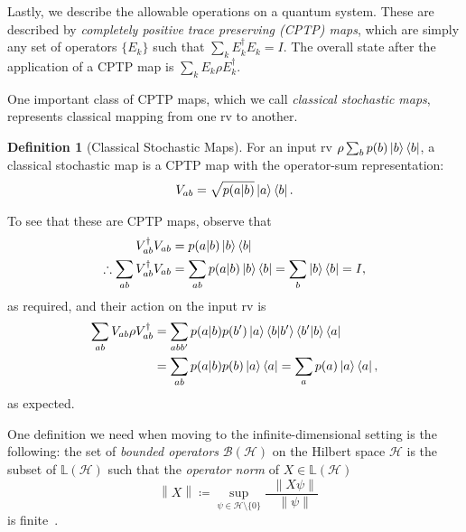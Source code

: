 \documentclass[10pt, a4paper]{article}
\numberwithin{equation}{section} %
\newcounter{stmt} %
\theoremstyle{definition}
\newtheorem{defn}[stmt]{Definition}
\theoremstyle{plain}
\newcommand{\norm}[1]{\mathop{}\left\lVert#1\right\rVert}
\newcommand{\?}{\mathrel{?}} %
\newcommand{\Lin}[1]{\mathbb{L}\left(#1\right)}
\newcommand{\Hs}{\mathcal{H}} %
\begin{document}
\begin{appendices}
                    Lastly, we describe the allowable operations on a quantum system. These are described by \emph{completely positive trace preserving (CPTP) maps}, which are simply any set of operators \(\{E_k\}\) such that \(\sum_k E_k^{\dagger}E_k = I\). The overall state after the application of a CPTP map is \(\sum_k E_k \rho E_k^{\dagger}\).

                    One important class of CPTP maps, which we call \emph{classical stochastic maps}, represents classical mapping from one rv to another. 
                    \begin{defn}[Classical Stochastic Maps]\label{def:classop}
                      For an input rv \(\rho \sum_b p(b)\ket{b}\bra{b}\), a classical stochastic map is a CPTP map with the operator-sum representation:
                    \begin{align*}
                      V_{ab} = \sqrt{p(a|b)}\ket{a}\bra{b}.
                    \end{align*}
                  \end{defn}
                  To see that these are CPTP maps, observe that
                  \begin{align*}
                    V_{ab}^{\dagger}V_{ab} &= p(a|b)\ket{b}\bra{b} \\
                    \therefore \sum_{ab} V_{ab}^{\dagger}V_{ab} &= \sum_{ab} p(a|b)\ket{b}\bra{b} = \sum_{b} \ket{b}\bra{b} = I,
                  \end{align*}
                  as required, and their action on the input rv is
                  \begin{align*}
                    \sum_{ab} V_{ab}\rho V_{ab}^{\dagger} &= \sum_{abb'} p(a|b)p(b') \ket{a}\braket{b|b'}\braket{b'|b}\bra{a}  \\
                                                          &= \sum_{ab} p(a|b)p(b) \ket{a}\bra{a} = \sum_{a} p(a) \ket{a}\bra{a},
                  \end{align*}
                  as expected.

                  One definition we need when moving to the infinite-dimensional setting is the following: the set of \emph{bounded operators} \(\mathcal{B}(\Hs)\) on the Hilbert space \(\Hs\) is the subset of \(\Lin{\Hs}\) such that the \emph{operator norm} of \(X \in \Lin{\Hs}\)
    \begin{equation}
    \norm{X} \coloneqq \sup_{\psi \in \Hs \setminus \{0\}} \frac{\norm{X\psi}}{\norm{\psi}}
  \end{equation}
    is finite~\cite{HallQuantumForMath}. 


\end{appendices}
\end{document}
